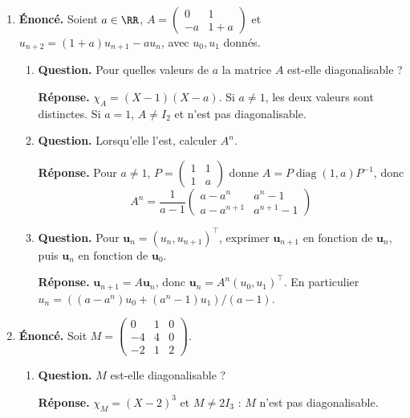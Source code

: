 \documentclass[12pt, a4paper]{article}
\begin{document}
\begin{enumerate}[label=9.\arabic*., start=94]
  \item \begin{minipage}[t]{\linewidth}\raggedright
\textbf{Énoncé.} Soient $a\in\RR$, $A=\begin{pmatrix}0&1\\-a&1+a\end{pmatrix}$ et $u_{n+2}=(1+a)u_{n+1}-au_n$, avec $u_0,u_1$ donnés.

\begin{enumerate}[\arabic*.]
        \item \textbf{Question.} Pour quelles valeurs de $a$ la matrice $A$ est-elle diagonalisable ?
\par\smallskip
\textbf{Réponse.} $\chi_A=(X-1)(X-a)$. Si $a\neq1$, les deux valeurs sont distinctes.
        Si $a=1$, $A\neq I_2$ et n'est pas diagonalisable.

  \item \textbf{Question.} Lorsqu’elle l’est, calculer $A^n$.
\par\smallskip
\textbf{Réponse.} Pour $a\neq1$, $P=\begin{pmatrix}1&1\\1&a\end{pmatrix}$ donne $A=P\operatorname{diag}(1,a)P^{-1}$, donc
        \[
          A^n=\frac1{a-1}\begin{pmatrix}a-a^n&a^n-1\\a-a^{n+1}&a^{n+1}-1\end{pmatrix}
        \]

  \item \textbf{Question.} Pour $\boldsymbol u_n=(u_n,u_{n+1})^\top$, exprimer $\boldsymbol u_{n+1}$ en fonction de $\boldsymbol u_n$, puis $\boldsymbol u_n$ en fonction de $\boldsymbol u_0$.
\par\smallskip
\textbf{Réponse.} $\boldsymbol u_{n+1}=A\boldsymbol u_n$, donc $\boldsymbol u_n=A^n(u_0,u_1)^\top$.
        En particulier $u_n=((a-a^n)u_0+(a^n-1)u_1)/(a-1)$.

\end{enumerate}
\end{minipage}

  \item \begin{minipage}[t]{\linewidth}\raggedright
\textbf{Énoncé.} Soit $M=\begin{pmatrix}0&1&0\\-4&4&0\\-2&1&2\end{pmatrix}$.

\begin{enumerate}[\arabic*.]
        \item \textbf{Question.} $M$ est-elle diagonalisable ?
\par\smallskip
\textbf{Réponse.} $\chi_M=(X-2)^3$ et $M\neq2I_3$ : $M$ n'est pas diagonalisable.


\end{enumerate}
\end{minipage}
\end{enumerate}
\end{document}
